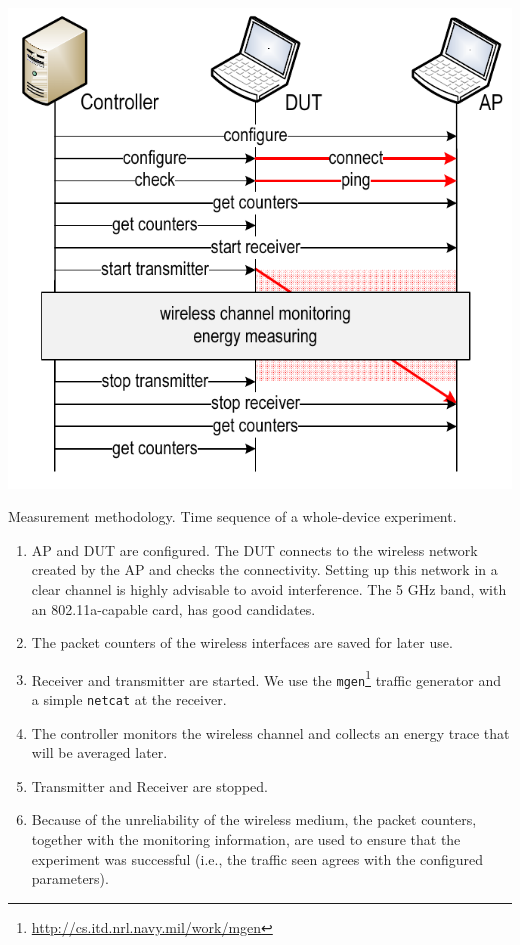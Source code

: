 \documentclass[twoside,nohyper]{tufte-book}
\providecommand{\tightlist}{%
  \setlength{\itemsep}{0pt}\setlength{\parskip}{0pt}}
\theoremstyle{definition}
\theoremstyle{definition}
\theoremstyle{definition}
\theoremstyle{remark}
\begin{document}
\begin{marginfigure}

{\centering \includegraphics[width=1\linewidth]{img/03/sequence} 

}

\caption[Measurement methodology. Time sequence of a whole-device
experiment.]{Measurement methodology. Time sequence of a whole-device
experiment.}\label{fig:sequence}
\end{marginfigure}

\begin{enumerate}
\def\labelenumi{\arabic{enumi}.}
\tightlist
\item
  AP and DUT are configured. The DUT connects to the wireless network
  created by the AP and checks the connectivity. Setting up this network
  in a clear channel is highly advisable to avoid interference. The 5
  GHz band, with an 802.11a-capable card, has good candidates.
\item
  The packet counters of the wireless interfaces are saved for later
  use.
\item
  Receiver and transmitter are started. We use the
  \texttt{mgen}\footnote{\url{http://cs.itd.nrl.navy.mil/work/mgen}}
  traffic generator and a simple \texttt{netcat} at the receiver.
\item
  The controller monitors the wireless channel and collects an energy
  trace that will be averaged later.
\item
  Transmitter and Receiver are stopped.
\item
  Because of the unreliability of the wireless medium, the packet
  counters, together with the monitoring information, are used to ensure
  that the experiment was successful (i.e., the traffic seen agrees with
  the configured parameters).
\end{enumerate}
\end{document}
